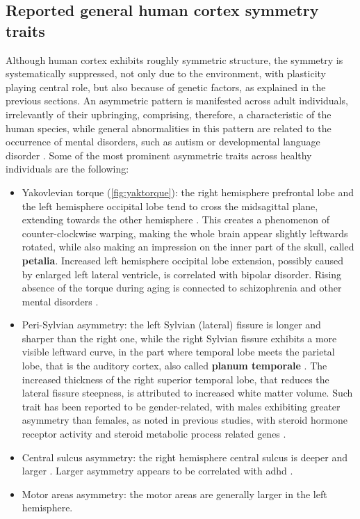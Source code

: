 \subsection{Reported general human cortex symmetry traits}
Although human cortex exhibits roughly symmetric structure, the symmetry is systematically suppressed, not only due to the environment, with plasticity playing central role, but also because of genetic factors, as explained in the previous sections. An asymmetric pattern is manifested across adult individuals, irrelevantly of their upbringing, comprising, therefore, a characteristic of the human species, while general abnormalities in this pattern are related to the occurrence of mental disorders, such as autism or developmental language disorder \cite{Herbert2005}\cite{Kong2022}. Some of the most prominent asymmetric traits across healthy individuals are the following:
\begin{itemize}
	\item{Yakovlevian torque (\autoref{fig:yaktorque}): the right hemisphere prefrontal lobe and the left hemisphere occipital lobe tend to cross the midsagittal plane, extending towards the other hemisphere \cite{Kuo2022}. This creates a phenomenon of counter-clockwise warping, making the whole brain appear slightly leftwards rotated, while also making an impression on the inner part of the skull, called \textbf{petalia}. Increased left hemisphere occipital lobe extension, possibly caused by enlarged left lateral ventricle, is correlated with bipolar disorder\cite{Maller2015}. Rising absence of the torque during aging is connected to schizophrenia  and other mental disorders \cite{Ribolsi2014}.}
	\item{Peri-Sylvian asymmetry: the left Sylvian (lateral) fissure is longer and sharper than the right one, while the right Sylvian fissure exhibits a more visible leftward curve, in the part where temporal lobe meets the parietal lobe, that is the auditory cortex, also called \textbf{planum temporale} \cite{Kuo2022}. The increased thickness of the right superior temporal lobe, that reduces the lateral fissure steepness, is attributed to increased white matter volume. Such trait has been reported to be gender-related, with males exhibiting greater asymmetry than females, as noted in previous studies, with steroid hormone receptor activity and steroid metabolic process related genes \cite{Guadalupe2015}.}
	\item{Central sulcus asymmetry: the right hemisphere central sulcus is deeper and larger \cite{Kuo2022}. Larger asymmetry appears to be correlated with \ac{adhd} \cite{Li2015}.}
	\item{Motor areas asymmetry: the motor areas are generally larger in the left hemisphere.}
\end{itemize}

